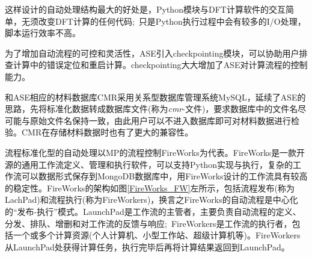 这样设计的自动处理结构最大的好处是，\textrm{Python}模块与\textrm{DFT}计算软件的交互简单，无须改变\textrm{DFT}计算的任何代码;~只是\textrm{Python}执行过程中会有较多的\textrm{I/O}处理，脚本运行效率不高。

为了增加自动流程的可控和灵活性，\textrm{ASE}引入\textrm{checkpointing}模块，可以协助用户排查计算中的错误定位和重启计算。\textrm{checkpointing}大大增加了\textrm{ASE}对计算流程的控制能力。

和\textrm{ASE}相应的材料数据库\textrm{CMR}采用关系型数据库管理系统\textrm{MySQL}，延续了\textrm{ASE}的思路，先将标准化数据转成数据库文件(称为\textit{cmr}-文件)，要求数据库中的文件名尽可能与原始文件名保持一致，由此用户可以不进入数据库即可对材料数据进行检验。\textrm{CMR}在存储材料数据时也有了更大的兼容性。

流程标准化型的自动处理以\textrm{MP}的流程控制\textrm{FireWorks}为代表。\textrm{FireWorks}是一款开源的通用工作流定义、管理和执行软件，可以支持\textrm{Python}实现与执行，复杂的工作流可以数据形式保存到\textrm{MongoDB}数据库中，用\textrm{FireWorks}设计的工作流具有较高的稳定性。\textrm{FireWorks}的架构如图\ref{FireWorks_FW}左所示，包括流程发布(称为\textrm{LachPad})和流程执行(称为\textrm{FireWorkers})，换言之\textrm{FireWorks}的自动流程是中心化的“发布-执行”模式。\textrm{LaunchPad}是工作流的主管者，主要负责自动流程的定义、分发、排队、增删和对工作流的反馈与响应;~\textrm{FireWorkers}是工作流的执行者，包括一个或多个计算资源(个人计算机、小型工作站、超级计算机等)。\textrm{FireWorkers}从\textrm{LaunchPad}处获得计算任务，执行完毕后再将计算结果返回到\textrm{LaunchPad}。

